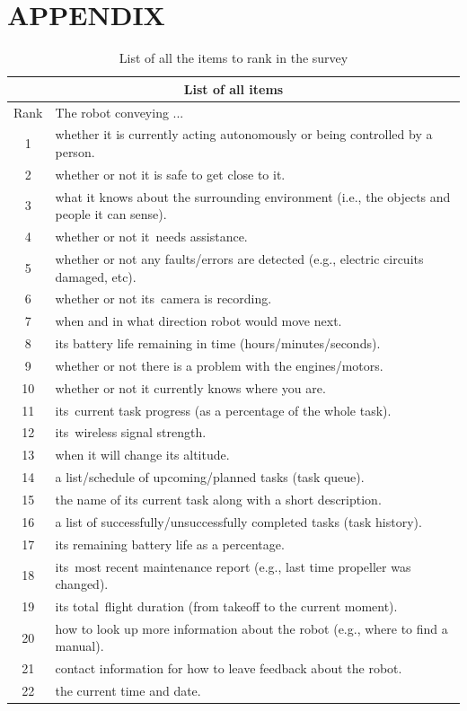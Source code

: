 \documentclass[letterpaper, 10 pt, conference]{ieeeconf}  %
\begin{document}
\section*{APPENDIX}
\begin {table}[h]
\begin{center}
\begin{tabular}{| c | l |}
 \hline
 \multicolumn{2}{|c|}{List of all items} \\
 \hline
 Rank & The robot conveying ... \\
 \hline
1 & whether it is currently acting autonomously or being controlled by a person.\\
\hline
2 &  whether or not it is safe to get close to it.\\
\hline
3 &  what it knows about the surrounding environment (i.e., the objects and people it can sense).\\
\hline
4 &  whether or not it needs assistance.\\
\hline
5 &  whether or not any faults/errors are detected (e.g., electric circuits damaged, etc).\\
\hline
6 &  whether or not its camera is recording.\\
\hline
7 &  when and in what direction robot would move next.\\
\hline
8 &  its battery life remaining in time (hours/minutes/seconds).\\
\hline
9 &  whether or not there is a problem with the engines/motors.\\
\hline
10 &  whether or not it currently knows where you are.\\
\hline
11 &  its current task progress (as a percentage of the whole task).\\
\hline
12 &  its wireless signal strength.\\
\hline
13 &  when it will change its altitude.\\
\hline
14 &  a list/schedule of upcoming/planned tasks (task queue).\\
\hline
15 &  the name of its current task along with a short description.\\
\hline
16 &  a list of successfully/unsuccessfully completed tasks (task history).\\
\hline
17 &  its remaining battery life as a percentage.\\
\hline
18 &  its most recent maintenance report (e.g., last time propeller was changed).\\
\hline
19 &  its total flight duration (from takeoff to the current moment).\\
\hline
20 &  how to look up more information about the robot (e.g., where to find a manual).\\
\hline
21 &  contact information for how to leave feedback about the robot.\\
\hline
22 &  the current time and date.\\
\hline
\end{tabular}
\end{center}
\caption{List of all the items to rank in the survey}
\label{table:list}
\end{table}
\end{document}
